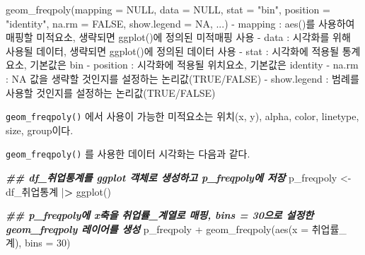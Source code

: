 \documentclass[
]{article}
\newenvironment{Shaded}{\begin{snugshade}}{\end{snugshade}}
\newcommand{\AttributeTok}[1]{\textcolor[rgb]{0.77,0.63,0.00}{#1}}
\newcommand{\ConstantTok}[1]{\textcolor[rgb]{0.00,0.00,0.00}{#1}}
\newcommand{\DecValTok}[1]{\textcolor[rgb]{0.00,0.00,0.81}{#1}}
\newcommand{\DocumentationTok}[1]{\textcolor[rgb]{0.56,0.35,0.01}{\textbf{\textit{#1}}}}
\newcommand{\ErrorTok}[1]{\textcolor[rgb]{0.64,0.00,0.00}{\textbf{#1}}}
\newcommand{\FunctionTok}[1]{\textcolor[rgb]{0.00,0.00,0.00}{#1}}
\newcommand{\NormalTok}[1]{#1}
\newcommand{\OtherTok}[1]{\textcolor[rgb]{0.56,0.35,0.01}{#1}}
\newcommand{\SpecialCharTok}[1]{\textcolor[rgb]{0.00,0.00,0.00}{#1}}
\newcommand{\StringTok}[1]{\textcolor[rgb]{0.31,0.60,0.02}{#1}}
\begin{document}
\begin{Shaded}
\begin{Highlighting}[]
\FunctionTok{geom\_freqpoly}\NormalTok{(}\AttributeTok{mapping =} \ConstantTok{NULL}\NormalTok{, }\AttributeTok{data =} \ConstantTok{NULL}\NormalTok{,  }\AttributeTok{stat =} \StringTok{"bin"}\NormalTok{,  }\AttributeTok{position =} \StringTok{"identity"}\NormalTok{, }\AttributeTok{na.rm =} \ConstantTok{FALSE}\NormalTok{, }\AttributeTok{show.legend =} \ConstantTok{NA}\NormalTok{, ...)}
  \SpecialCharTok{{-}}\NormalTok{ mapping }\SpecialCharTok{:} \FunctionTok{aes}\NormalTok{()를 사용하여 매핑할 미적요소, 생략되면 }\FunctionTok{ggplot}\NormalTok{()에 정의된 미적매핑 사용}
  \SpecialCharTok{{-}}\NormalTok{ data }\SpecialCharTok{:}\NormalTok{ 시각화를 위해 사용될 데이터, 생략되면 }\FunctionTok{ggplot}\NormalTok{()에 정의된 데이터 사용}
  \SpecialCharTok{{-}}\NormalTok{ stat }\SpecialCharTok{:}\NormalTok{ 시각화에 적용될 통계요소, 기본값은 }\StringTok{\textquotesingle{}bin\textquotesingle{}}
  \SpecialCharTok{{-}}\NormalTok{ position }\SpecialCharTok{:}\NormalTok{ 시각화에 적용될 위치요소, 기본값은 }\StringTok{\textquotesingle{}identity\textquotesingle{}}
  \SpecialCharTok{{-}}\NormalTok{ na.rm }\SpecialCharTok{:} \ConstantTok{NA}\NormalTok{ 값을 생략할 것인지를 설정하는 논리값(}\ConstantTok{TRUE}\SpecialCharTok{/}\ConstantTok{FALSE}\NormalTok{)}
  \SpecialCharTok{{-}}\NormalTok{ show.legend }\SpecialCharTok{:}\NormalTok{ 범례를 사용할 것인지를 설정하는 논리값(}\ConstantTok{TRUE}\SpecialCharTok{/}\ConstantTok{FALSE}\NormalTok{)}
\end{Highlighting}
\end{Shaded}

\texttt{geom\_freqpoly()} 에서 사용이 가능한 미적요소는 위치(x, y), alpha, color, linetype, size, group이다.

\texttt{geom\_freqpoly()} 를 사용한 데이터 시각화는 다음과 같다.

\begin{Shaded}
\begin{Highlighting}[]
\DocumentationTok{\#\#  df\_취업통계를 ggplot 객체로 생성하고 p\_freqpoly에 저장}
\NormalTok{p\_freqpoly }\OtherTok{\textless{}{-}}\NormalTok{ df\_취업통계 }\SpecialCharTok{|}\ErrorTok{\textgreater{}}
  \FunctionTok{ggplot}\NormalTok{()}

\DocumentationTok{\#\# p\_freqpoly에 x축을 \textquotesingle{}취업률\_계\textquotesingle{}열로 매핑, bins = 30으로 설정한 geom\_freqpoly 레이어를 생성 }
\NormalTok{p\_freqpoly }\SpecialCharTok{+}
  \FunctionTok{geom\_freqpoly}\NormalTok{(}\FunctionTok{aes}\NormalTok{(}\AttributeTok{x =}\NormalTok{ 취업률\_계), }\AttributeTok{bins =} \DecValTok{30}\NormalTok{)}
\end{Highlighting}
\end{Shaded}
\end{document}
